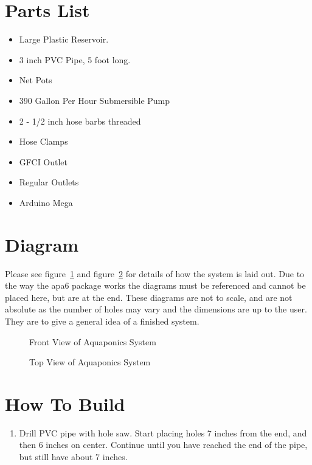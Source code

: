 \documentclass[american,man,12pt]{apa6}
\begin{document}
\section{Parts List}
\begin{itemize}
	\item Large Plastic Reservoir.
	\item 3 inch PVC Pipe, 5 foot long.
	\item Net Pots
	\item 390 Gallon Per Hour Submersible Pump
    \item 2 - 1/2 inch hose barbs threaded
    \item Hose Clamps
    \item GFCI Outlet
    \item Regular Outlets
    \item Arduino Mega
\end{itemize}

\section{Diagram}
Please see figure~\ref{fig:front view} and figure~\ref{fig:top view} for
details of how the system is laid out. Due to the way the apa6 package works the
diagrams must be referenced and cannot be placed here, but are at the end. These
diagrams are not to scale, and are not absolute as the number of holes may vary
and the dimensions are up to the user. They are to give a general idea of a
finished system.

\begin{figure}[h]
    \centering
    \caption{Front View of Aquaponics System}
    \label{fig:front view}
\end{figure}

\begin{figure}[h]
    \centering
    \caption{Top View of Aquaponics System}
    \label{fig:top view}
\end{figure}


\section{How To Build}
\begin{enumerate}
	\item Drill PVC pipe with hole saw. Start placing holes 7 inches from the
		  end, and then 6 inches on center. Continue until you have reached
		  the end of the pipe, but still have about 7 inches.
\end{enumerate}
\end{document}
